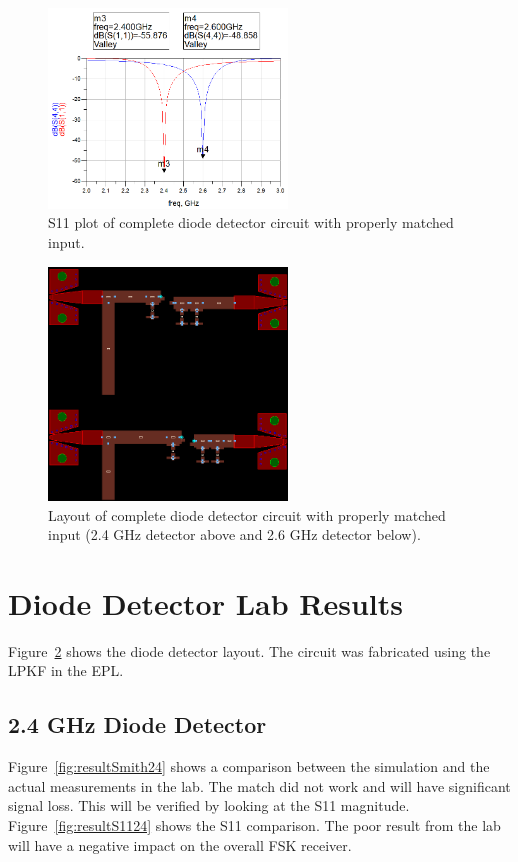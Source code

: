 \documentclass[conference]{IEEEtran}
\begin{document}
\begin{figure}[!htb]
\centering
\includegraphics[width=2.5in]{diode-pics/diodedetectorS11matched-final.png}
\caption{S11 plot of complete diode detector circuit with properly matched input.}
\label{fig:FinalDDS11}
\end{figure}

\begin{figure}[!htb]
\centering
\includegraphics[width=2.5in]{diode-pics/diodedetectorlayout.png}
\caption{Layout of complete diode detector circuit with properly matched input (2.4 GHz detector above and 2.6 GHz detector below).}
\label{fig:FinalDDLayout}
\end{figure}

\section{Diode Detector Lab Results}
Figure~\ref{fig:FinalDDLayout} shows the diode detector layout.  The circuit was fabricated using the LPKF in the EPL.
\subsection{2.4 GHz Diode Detector}
Figure~\ref{fig:resultSmith24} shows a comparison between the simulation and the actual measurements in the lab.  The match did not work and will have significant signal loss.  This will be verified by looking at the S11 magnitude. Figure~\ref{fig:resultS1124} shows the S11 comparison.  The poor result from the lab will have a negative impact on the overall FSK receiver.
\end{document}
